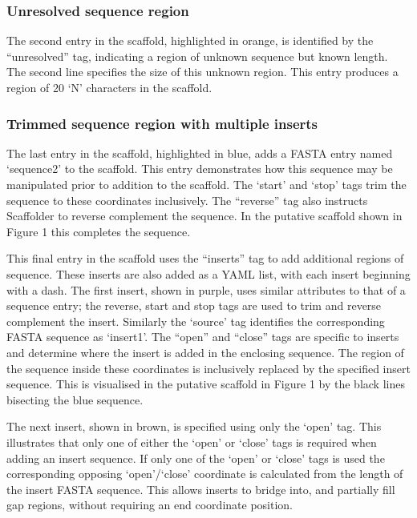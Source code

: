 \documentclass[10pt]{bmc_article}
\newenvironment{bmcformat}{\begin{raggedright}\baselineskip20pt\sloppy\setboolean{publ}{false}}{\end{raggedright}\baselineskip20pt\sloppy}
\begin{document}
\begin{bmcformat}
\subsubsection*{Unresolved sequence region} %

The second entry in the scaffold, highlighted in orange, is identified by the
``unresolved'' tag, indicating a region of unknown sequence but known length.
The second line specifies the size of this unknown region. This entry produces
a region of 20 `N' characters in the scaffold. \pb

\subsubsection*{Trimmed sequence region with multiple inserts} %

The last entry in the scaffold, highlighted in blue, adds a FASTA entry named
`sequence2' to the scaffold. This entry demonstrates how this sequence may be
manipulated prior to addition to the scaffold. The `start' and `stop' tags trim
the sequence to these coordinates inclusively. The ``reverse'' tag also
instructs Scaffolder to reverse complement the sequence. In the putative
scaffold shown in Figure 1 this completes the sequence. \pb

This final entry in the scaffold uses the ``inserts'' tag to add additional
regions of sequence. These inserts are also added as a YAML list, with each
insert beginning with a dash. The first insert, shown in purple, uses similar
attributes to that of a sequence entry; the reverse, start and stop tags are
used to trim and reverse complement the insert. Similarly the `source' tag
identifies the corresponding FASTA sequence as `insert1'. The ``open'' and
``close'' tags are specific to inserts and determine where the insert is added
in the enclosing sequence. The region of the sequence inside these coordinates
is inclusively replaced by the specified insert sequence. This is visualised in
the putative scaffold in Figure 1 by the black lines bisecting the blue
sequence. \pb

The next insert, shown in brown, is specified using only the `open' tag. This
illustrates that only one of either the `open' or `close' tags is required when
adding an insert sequence. If only one of the `open' or `close' tags is used
the corresponding opposing `open'/`close' coordinate is calculated from the
length of the insert FASTA sequence. This allows inserts to bridge into, and
partially fill gap regions, without requiring an end coordinate position. \pb


\end{bmcformat}
\end{document}
